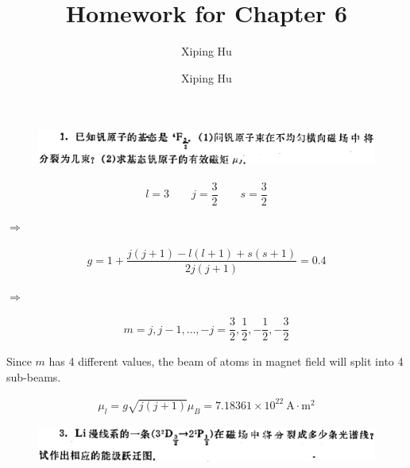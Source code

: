 \documentclass{article}
\author{Xiping Hu}
\author{Xiping Hu}
\affil{https://hxp.plus/}
\title{Homework for Chapter 6}
\begin{document}
\maketitle

\begin{figure}[H]
  \centering
  \includegraphics[width=\linewidth]{figures/Problem1}
  \label{fig:}
\end{figure}

\begin{equation*}
  \begin{aligned}
    l = 3 \quad\quad
    j = \dfrac{3}{2} \quad\quad
    s = \dfrac{3}{2} 
  \end{aligned}
\end{equation*}

$\Rightarrow$

\begin{equation*}
  \begin{aligned}
    g = 1 + \dfrac{j \left( j + 1 \right) - l \left( l + 1 \right) + s \left( s + 1 \right)}{2 j \left( j + 1 \right)} = 0.4 
  \end{aligned}
\end{equation*}

$\Rightarrow $

\begin{equation*}
  \begin{aligned}
    m = j, j - 1, \dots, -j = \dfrac{3}{2} , \dfrac{1}{2} , - \dfrac{1}{2} , - \dfrac{3}{2}   
  \end{aligned}
\end{equation*}

Since $m$ has 4 different values, the beam of atoms in magnet field will split into 4 sub-beams.

\begin{equation*}
  \begin{aligned}
    \mu_l = g \sqrt{j \left( j + 1 \right)} \mu_B = 7.18361 \times 10^{22} \  \mathrm{A \cdot m^2}
  \end{aligned}
\end{equation*}

\begin{figure}[H]
  \centering
  \includegraphics[width=\linewidth]{figures/Problem3}
  \label{fig:}
\end{figure}
\end{document}
